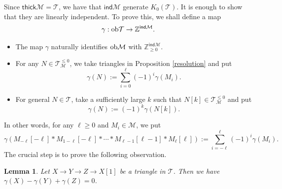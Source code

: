 \documentclass[a4paper,reqno]{amsart}
\newtheorem{lemma}[theorem]{Lemma}
\theoremstyle{definition}
\newcommand{\TT}{{\mathcal T}}
\newcommand{\MM}{{\mathcal M}}
\newcommand{\Z}{\mathbb{Z}}
\newcommand{\ind}{\mathsf{ind}}
\newcommand{\thick}{\mathsf{thick}}
\begin{document}
Since $\thick\MM=\TT$, we have that $\ind\MM$ generate $K_0(\TT)$.
It is enough to show that they are linearly independent.
To prove this, we shall define a map
\[\gamma:{\rm ob}\TT\to\Z^{\ind\MM}.\]
\begin{itemize}
\item The map $\gamma$ naturally identifies ${\rm ob}\MM$ with $\Z_{\ge0}^{\ind\MM}$.
\item For any $N\in\TT_{\MM}^{\le0}$, we take triangles in Proposition \ref{resolution} and put
\[\gamma(N):=\sum_{i=0}^\ell(-1)^i\gamma(M_i).\]
\item For general $N\in\TT$, take a sufficiently large $k$ such that $N[k]\in\TT_{\MM}^{\le0}$ and put
\[\gamma(N):=(-1)^k\gamma(N[k]).\]
\end{itemize}
In other words, for any $\ell\ge0$ and $M_i\in\MM$, we put
\[\gamma(M_{-\ell}[-\ell]*M_{1-\ell}[-\ell]*\cdots*M_{\ell-1}[\ell-1]*M_\ell[\ell]):=\sum_{i=-\ell}^\ell(-1)^i\gamma(M_i).\]
The crucial step is to prove the following observation.

\begin{lemma}\label{gamma is on grothendieck}
Let $X\to Y\to Z\to X[1]$ be a triangle in $\TT$. Then we have $\gamma(X)-\gamma(Y)+\gamma(Z)=0$.
\end{lemma}
\end{document}
